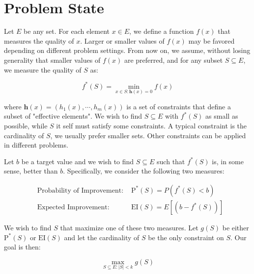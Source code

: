 \documentclass[12pt,fleqn]{article}
\newcommand{\EI}{\text{EI}}
\newcommand{\PI}{\text{P}^*}
\begin{document}
\section{Problem State}
Let $E$ be any set. For each element $x\in E$, we define a function $f(x)$ that measures the quality of $x$. Larger or smaller values of $f(x)$ may be favored depending on different problem settings. From now on, we assume, without losing generality that smaller values of $f(x)$ are preferred, and for any subset $S\subseteq E$, we measure the quality of $S$ as:

\begin{equation*}
f^*(S) = \min_{x\in S:\mathbf{h}(x)=0}f(x)
\end{equation*}

where $\mathbf{h}(x)=(h_1(x),\cdots,h_m(x))$ is a set of constraints that define a subset of "effective elements". We wish to find $S\subseteq E$ with $f^*(S)$ as small as possible, while $S$ it self must satisfy some constraints. A typical constraint is the cardinality of $S$, we usually prefer smaller sets. Other constraints can be applied in different problems.

Let $b$ be a target value and we wish to find $S\subseteq E$ such that $f^*(S)$ is, in some sense, better than $b$. Specifically, we consider the following two measures:

\begin{eqnarray*}
&\text{Probability of Improvement: }&\PI(S) = P(f^*(S) < b)\\
&\text{Expected Improvement: }&\EI(S) = E[(b-f^*(S))]
\end{eqnarray*}

We wish to find $S$ that maximize one of these two measures. Let $g(S)$ be either $\PI(S)$ or $\EI(S)$ and let the cardinality of $S$ be the only constraint on $S$. Our goal is then:

\begin{equation*}
\max_{S\subseteq E:|S|<k}g(S)
\end{equation*}
\end{document}
